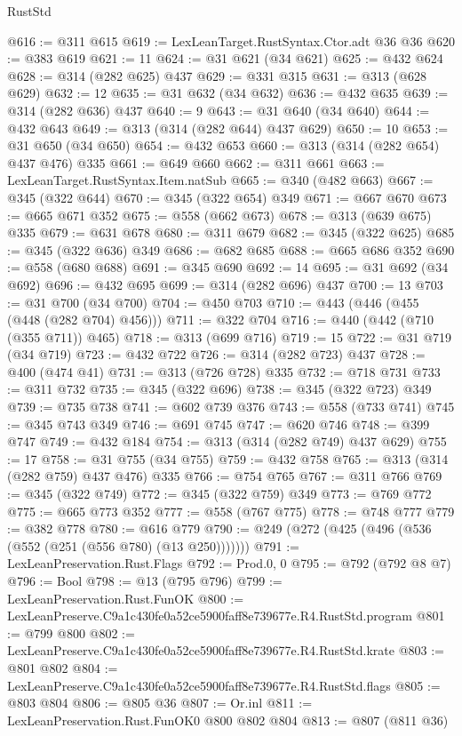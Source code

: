\begin{lexlean}{RustStd}
\begin{coremodule}
@616 := @311 @615
@619 := LexLeanTarget.RustSyntax.Ctor.adt @36 @36
@620 := @383 @619
@621 := 11
@624 := @31 @621 (@34 @621)
@625 := @432 @624
@628 := @314 (@282 @625) @437
@629 := @331 @315
@631 := @313 (@628 @629)
@632 := 12
@635 := @31 @632 (@34 @632)
@636 := @432 @635
@639 := @314 (@282 @636) @437
@640 := 9
@643 := @31 @640 (@34 @640)
@644 := @432 @643
@649 := @313 (@314 (@282 @644) @437 @629)
@650 := 10
@653 := @31 @650 (@34 @650)
@654 := @432 @653
@660 := @313 (@314 (@282 @654) @437 @476) @335
@661 := @649 @660
@662 := @311 @661
@663 := LexLeanTarget.RustSyntax.Item.natSub
@665 := @340 (@482 @663)
@667 := @345 (@322 @644)
@670 := @345 (@322 @654) @349
@671 := @667 @670
@673 := @665 @671 @352
@675 := @558 (@662 @673)
@678 := @313 (@639 @675) @335
@679 := @631 @678
@680 := @311 @679
@682 := @345 (@322 @625)
@685 := @345 (@322 @636) @349
@686 := @682 @685
@688 := @665 @686 @352
@690 := @558 (@680 @688)
@691 := @345 @690
@692 := 14
@695 := @31 @692 (@34 @692)
@696 := @432 @695
@699 := @314 (@282 @696) @437
@700 := 13
@703 := @31 @700 (@34 @700)
@704 := @450 @703
@710 := @443 (@446 (@455 (@448 (@282 @704) @456)))
@711 := @322 @704
@716 := @440 (@442 (@710 (@355 @711)) @465)
@718 := @313 (@699 @716)
@719 := 15
@722 := @31 @719 (@34 @719)
@723 := @432 @722
@726 := @314 (@282 @723) @437
@728 := @400 (@474 @41)
@731 := @313 (@726 @728) @335
@732 := @718 @731
@733 := @311 @732
@735 := @345 (@322 @696)
@738 := @345 (@322 @723) @349
@739 := @735 @738
@741 := @602 @739 @376
@743 := @558 (@733 @741)
@745 := @345 @743 @349
@746 := @691 @745
@747 := @620 @746
@748 := @399 @747
@749 := @432 @184
@754 := @313 (@314 (@282 @749) @437 @629)
@755 := 17
@758 := @31 @755 (@34 @755)
@759 := @432 @758
@765 := @313 (@314 (@282 @759) @437 @476) @335
@766 := @754 @765
@767 := @311 @766
@769 := @345 (@322 @749)
@772 := @345 (@322 @759) @349
@773 := @769 @772
@775 := @665 @773 @352
@777 := @558 (@767 @775)
@778 := @748 @777
@779 := @382 @778
@780 := @616 @779
@790 := @249 (@272 (@425 (@496 (@536 (@552 (@251 (@556 @780) (@13 @250)))))))
@791 := LexLeanPreservation.Rust.Flags
@792 := Prod.{0, 0}
@795 := @792 (@792 @8 @7)
@796 := Bool
@798 := @13 (@795 @796)
@799 := LexLeanPreservation.Rust.FunOK
@800 := LexLeanPreserve.C9a1c430fe0a52ce5900faff8e739677e.R4.RustStd.program
@801 := @799 @800
@802 := LexLeanPreserve.C9a1c430fe0a52ce5900faff8e739677e.R4.RustStd.krate
@803 := @801 @802
@804 := LexLeanPreserve.C9a1c430fe0a52ce5900faff8e739677e.R4.RustStd.flags
@805 := @803 @804
@806 := @805 @36
@807 := Or.inl
@811 := LexLeanPreservation.Rust.FunOK0 @800 @802 @804
@813 := @807 (@811 @36)

\end{coremodule}
\end{lexlean}
